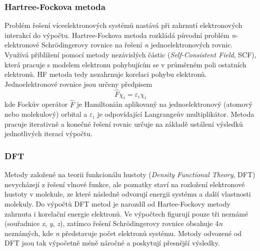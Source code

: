 \subsubsection{Hartree-Fockova metoda}
Problém řešení víceelektronových systémů nastává při zahrnutí elektronových interakcí do výpočtu. Hartree-Fockova metoda rozkládá původní problém \textit{n}-elektronové Schrödingerovy rovnice na řešení \textit{n} jednoelektronových rovnic. Využívá přiblížení pomocí metody nezávislých částic (\textit{Self-Consistent Field}, SCF), která pracuje s modelem elektronu pohybujícím se v průměrném poli ostatních elektronů. HF metoda tedy nezahrnuje korelaci pohybu elektronů.
Jednoelektronové rovnice jsou určeny předpisem
\begin{equation}
    \hat{F} \chi_i = \varepsilon_i \chi_i
\end{equation}
kde Fockův operátor $\hat{F}$ je Hamiltonián aplikovaný na jednoelektronový (atomový nebo molekulový) orbital a $\varepsilon_i$ je odpovídající Langrangeův multiplikátor. Metoda pracuje iterativně a konečné řešení rovnic určuje na základě ustálení výsledků jednotlivých iterací výpočtu.



\subsubsection{DFT}
Metody založené na teorii funkcionálu hustoty (\textit{Density Functional Theory}, DFT) nevycházejí z řešení vlnové funkce, ale  poznatky staví na rozložení elektronové hustoty v molekule, ze které následně odvozují energii systému a další vlastnosti molekuly. Do výpočtů DFT metod je narozdíl od Hartee-Fockovy metody zahrnuta i korelační energie elektronů. Ve výpočtech figurují pouze tři neznámé (souřadnice \textit{x}, \textit{y}, \textit{z}), zatímco řešení Schrödingerovy rovnice obsahuje 4\textit{n} neznámých, kde \textit{n} představuje počet elektronů systému. Metody odvozené od DFT jsou tak výpočetně méně náročné a poskytují přesnější výsledky.

